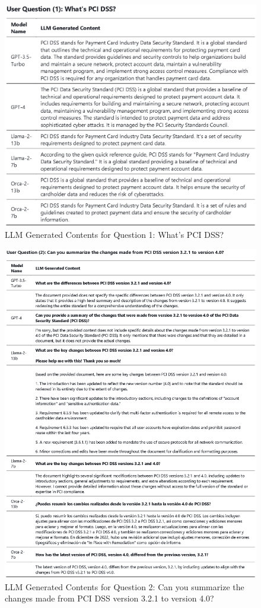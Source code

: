 \documentclass[runningheads]{llncs}
\begin{document}
\begin{figure}
    \centering
    \includegraphics[width=1.3\linewidth]{figures/question_1.eps}
    \caption{LLM Generated Contents for Question 1: What’s PCI DSS?}
    \label{fig:Question  1}
\end{figure}

\begin{figure}
    \centering
    \includegraphics[width=1.3\linewidth]{figures/question_2.eps}
    \caption{LLM Generated Contents for Question 2: Can you summarize the changes made from PCI DSS version 3.2.1 to version 4.0?}
    \label{fig:Question  2}
\end{figure}
\end{document}
